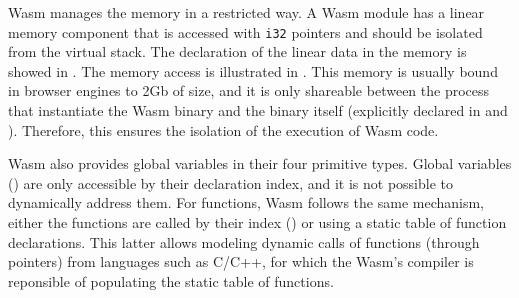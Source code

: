 \begin{code}
    \begin{minipage}[t]{0.4\linewidth}

\end{minipage}\hspace{10mm}
\begin{minipage}[t]{0.4\linewidth}

%

\end{minipage}






\end{code}

Wasm  manages the memory in a restricted way. A Wasm  module has a linear memory component that is accessed with \texttt{i32} pointers and should be isolated from the virtual stack. The declaration of the linear data in the memory is showed in . The memory access is illustrated in . This memory is usually bound in browser engines to 2Gb of size, and it is only shareable between the process that instantiate the Wasm  binary and the binary itself (explicitly declared in  and ). Therefore, this ensures the isolation of the execution of Wasm  code. 

Wasm  also provides global variables in their four primitive types. Global variables () are only accessible by their declaration index, and it is not possible to dynamically address them. For functions, Wasm  follows the same mechanism, either the functions are called by their index () or using a static table of function declarations. This latter allows modeling dynamic calls of functions (through pointers) from languages such as C/C++, for which the Wasm's compiler is reponsible of populating the static table of functions.


